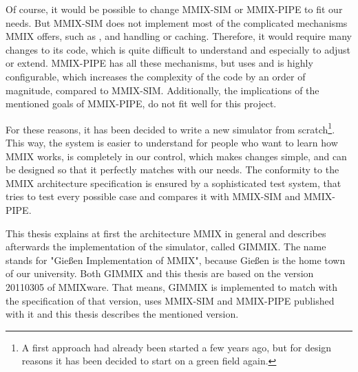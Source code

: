 Of course, it would be possible to change MMIX-SIM or MMIX-PIPE to fit our needs. But MMIX-SIM does not implement most of the complicated mechanisms MMIX offers, such as ,  and  handling or caching. Therefore, it would require many changes to its code, which is quite difficult to understand and especially to adjust or extend. MMIX-PIPE has all these mechanisms, but uses  and is highly configurable, which increases the complexity of the code by an order of magnitude, compared to MMIX-SIM. Additionally, the implications of the mentioned goals of MMIX-PIPE, do not fit well for this project.

For these reasons, it has been decided to write a new simulator from scratch\footnote{A first approach had already been started a few years ago, but for design reasons it has been decided to start on a green field again.}. This way, the system is easier to understand for people who want to learn how MMIX works, is completely in our control, which makes changes simple, and can be designed so that it perfectly matches with our needs. The conformity to the MMIX architecture specification is ensured by a sophisticated test system, that tries to test every possible case and compares it with MMIX-SIM and MMIX-PIPE.

\medskip

This thesis explains at first the architecture MMIX in general and describes afterwards the implementation of the simulator, called GIMMIX. The name stands for "Gießen Implementation of MMIX", because Gießen is the home town of our university. Both GIMMIX and this thesis are based on the version 20110305 of MMIXware. That means, GIMMIX is implemented to match with the specification of that version, uses MMIX-SIM and MMIX-PIPE published with it and this thesis describes the mentioned version.

